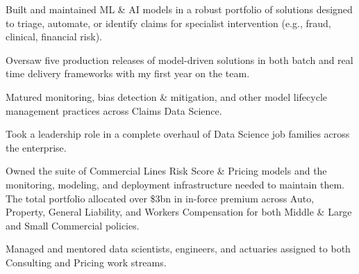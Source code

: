 \documentclass[letterpaper]{deedy-resume} %
\begin{document}
\begin{minipage}[t]{0.68\textwidth}
  \hfill
  \begin{tightitemize}
    \item Built and maintained ML \& AI models in a robust portfolio of solutions designed to triage, automate, or 
    identify claims for specialist intervention (e.g., fraud, clinical, financial risk).
    \item Oversaw five production releases of model-driven solutions in both batch and real time
      delivery frameworks with my first year on the team.
    \item Matured monitoring, bias detection \& mitigation, and other model lifecycle management practices across Claims Data Science.
    \item Took a leadership role in a complete overhaul of Data Science job families
      across the enterprise.
  \end{tightitemize}
  \sectionspace
  
  \hfill
  \begin{tightitemize}
  \item Owned the suite of Commercial Lines Risk Score \& Pricing models
    and the monitoring, modeling, and deployment infrastructure needed
    to maintain them. The total portfolio allocated over \$3bn in in-force
    premium across Auto, Property, General Liability, and
    Workers Compensation for both Middle \& Large and Small Commercial
    policies.
  \item Managed and mentored data scientists, engineers, and actuaries assigned to both
   Consulting and Pricing work streams.

  \end{tightitemize}
  \sectionspace

  

  

  


\end{minipage} %
\newpage
\end{document}

